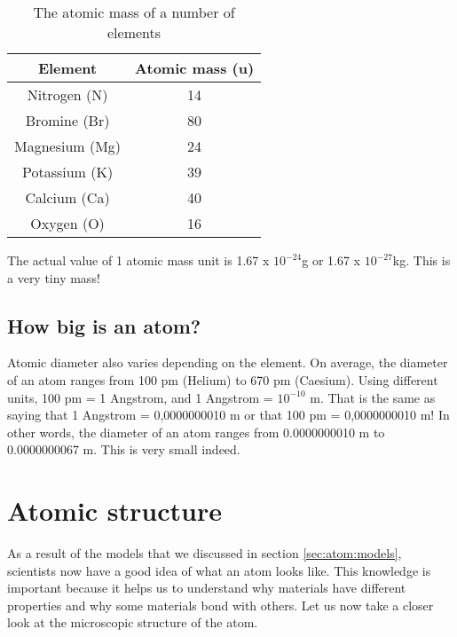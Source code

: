 \begin{table}[!h]
\begin{center}
\caption{The atomic mass of a number of elements}
\label{tab:atomic mass}

\begin{tabular}{|c|c|}\hline
\textbf{Element} & \textbf{Atomic mass (u)}\\\hline
Nitrogen (N) & 14 \\\hline
Bromine (Br) & 80 \\\hline
Magnesium (Mg) & 24 \\\hline
Potassium (K) & 39 \\\hline
Calcium (Ca) & 40 \\\hline
Oxygen (O) & 16 \\\hline
\end{tabular}
\end{center}
\end{table}


The actual value of 1 atomic mass unit is 1.67 x $10^{-24}$g or 1.67 x $10^{-27}$kg. This is a very tiny mass! 

\subsection{How big is an atom?}

Atomic diameter also varies depending on the element. On average, the diameter of an atom ranges from 100 pm (Helium) to 670 pm (Caesium). Using different units, 100 pm = 1 Angstrom, and 1 Angstrom = $10^{-10}$ m. That is the same as saying that 1 Angstrom = 0,0000000010 m or that 100 pm = 0,0000000010 m! In other words, the diameter of an atom ranges from 0.0000000010 m to 0.0000000067 m. This is very small indeed.








\section{Atomic structure}
\label{sec:atom:structure}

As a result of the models that we discussed in section \ref{sec:atom:models}, scientists now have a good idea of what an atom looks like. This knowledge is important because it helps us to understand why materials have different properties and why some materials bond with others. Let us now take a closer look at the microscopic structure of the atom.\\

